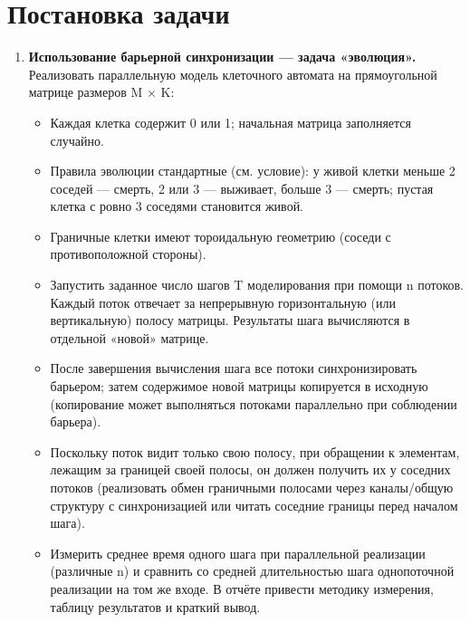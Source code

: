 \documentclass[a4paper, 14pt]{extarticle}
\begin{document}
\section*{Постановка задачи}\label{Sect::goal}
\begin{enumerate}
    \item \textbf{Использование барьерной синхронизации — задача «эволюция».}\\
        Реализовать параллельную модель клеточного автомата на прямоугольной матрице размеров M \(\times\) K:
        \begin{itemize}
            \item Каждая клетка содержит 0 или 1; начальная матрица заполняется случайно.
            \item Правила эволюции стандартные (см. условие): у живой клетки меньше 2 соседей — смерть, 2 или 3 — выживает, больше 3 — смерть; пустая клетка с ровно 3 соседями становится живой.
            \item Граничные клетки имеют тороидальную геометрию (соседи с противоположной стороны).
            \item Запустить заданное число шагов T моделирования при помощи n потоков. Каждый поток отвечает за непрерывную горизонтальную (или вертикальную) полосу матрицы. Результаты шага вычисляются в отдельной «новой» матрице.
            \item После завершения вычисления шага все потоки синхронизировать барьером; затем содержимое новой матрицы копируется в исходную (копирование может выполняться потоками параллельно при соблюдении барьера).
            \item Поскольку поток видит только свою полосу, при обращении к элементам, лежащим за границей своей полосы, он должен получить их у соседних потоков (реализовать обмен граничными полосами через каналы/общую структуру с синхронизацией или читать соседние границы перед началом шага).
            \item Измерить среднее время одного шага при параллельной реализации (различные n) и сравнить со средней длительностью шага однопоточной реализации на том же входе. В отчёте привести методику измерения, таблицу результатов и краткий вывод.
        \end{itemize}


\end{enumerate}
\end{document}

